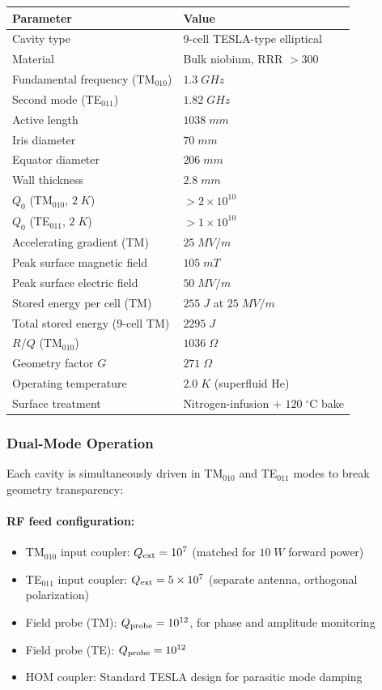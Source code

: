 \documentclass[11pt,a4paper]{article}
\begin{document}
\begin{longtable}{p{}p{}}
\toprule
\textbf{Parameter} & \textbf{Value} \\
\midrule
\endhead
Cavity type & 9-cell TESLA-type elliptical \\
Material & Bulk niobium, RRR $> 300$ \\
Fundamental frequency (TM$_{010}$) & $1.3\;\si{GHz}$ \\
Second mode (TE$_{011}$) & $1.82\;\si{GHz}$ \\
Active length & $1038\;\si{mm}$ \\
Iris diameter & $70\;\si{mm}$ \\
Equator diameter & $206\;\si{mm}$ \\
Wall thickness & $2.8\;\si{mm}$ \\
$Q_0$ (TM$_{010}$, $2\;\si{K}$) & $> 2 \times 10^{10}$ \\
$Q_0$ (TE$_{011}$, $2\;\si{K}$) & $> 1 \times 10^{10}$ \\
Accelerating gradient (TM) & $25\;\si{MV/m}$ \\
Peak surface magnetic field & $105\;\si{mT}$ \\
Peak surface electric field & $50\;\si{MV/m}$ \\
Stored energy per cell (TM) & $255\;\si{J}$ at $25\;\si{MV/m}$ \\
Total stored energy (9-cell TM) & $2295\;\si{J}$ \\
$R/Q$ (TM$_{010}$) & $1036\;\si{\Omega}$ \\
Geometry factor $G$ & $271\;\si{\Omega}$ \\
Operating temperature & $2.0\;\si{K}$ (superfluid He) \\
Surface treatment & Nitrogen-infusion + $120\;^\circ$C bake \\
\bottomrule
\end{longtable}

\subsubsection{Dual-Mode Operation}

Each cavity is simultaneously driven in TM$_{010}$ and TE$_{011}$
modes to break geometry transparency:

\paragraph{RF feed configuration:}
\begin{itemize}[nosep]
\item TM$_{010}$ input coupler: $Q_{\rm ext} = 10^7$ (matched
for $10\;\si{W}$ forward power)
\item TE$_{011}$ input coupler: $Q_{\rm ext} = 5 \times 10^7$
(separate antenna, orthogonal polarization)
\item Field probe (TM): $Q_{\rm probe} = 10^{12}$, for phase
and amplitude monitoring
\item Field probe (TE): $Q_{\rm probe} = 10^{12}$
\item HOM coupler: Standard TESLA design for parasitic mode
damping
\end{itemize}
\end{document}
